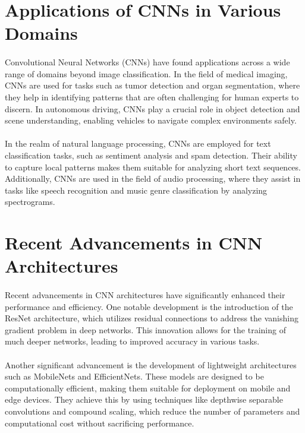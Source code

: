 \section{Applications of CNNs in Various Domains}
\label{sec:applications}

\paragraph{}
Convolutional Neural Networks (CNNs) have found applications across a wide range of domains beyond image classification. In the field of medical imaging, CNNs are used for tasks such as tumor detection and organ segmentation, where they help in identifying patterns that are often challenging for human experts to discern. In autonomous driving, CNNs play a crucial role in object detection and scene understanding, enabling vehicles to navigate complex environments safely.

\paragraph{}
In the realm of natural language processing, CNNs are employed for text classification tasks, such as sentiment analysis and spam detection. Their ability to capture local patterns makes them suitable for analyzing short text sequences. Additionally, CNNs are used in the field of audio processing, where they assist in tasks like speech recognition and music genre classification by analyzing spectrograms.

\section{Recent Advancements in CNN Architectures}
\label{sec:advancements}

\paragraph{}
Recent advancements in CNN architectures have significantly enhanced their performance and efficiency. One notable development is the introduction of the ResNet architecture, which utilizes residual connections to address the vanishing gradient problem in deep networks. This innovation allows for the training of much deeper networks, leading to improved accuracy in various tasks.

\paragraph{}
Another significant advancement is the development of lightweight architectures such as MobileNets and EfficientNets. These models are designed to be computationally efficient, making them suitable for deployment on mobile and edge devices. They achieve this by using techniques like depthwise separable convolutions and compound scaling, which reduce the number of parameters and computational cost without sacrificing performance.


